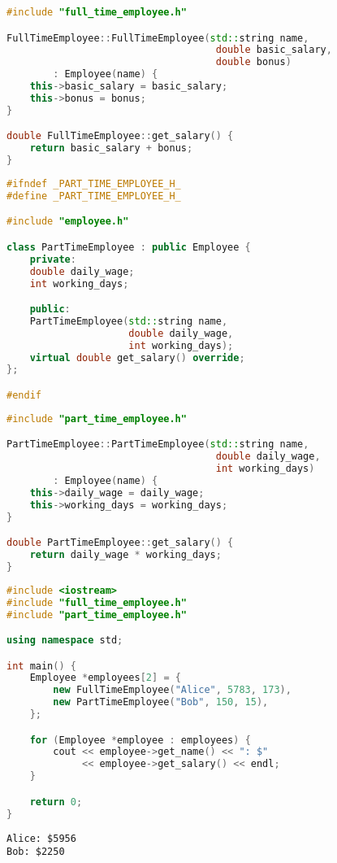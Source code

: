 \begin{lstlisting}[language=C++]
#include "full_time_employee.h"

FullTimeEmployee::FullTimeEmployee(std::string name,
                                    double basic_salary,
                                    double bonus)
        : Employee(name) {
    this->basic_salary = basic_salary;
    this->bonus = bonus;
}

double FullTimeEmployee::get_salary() {
    return basic_salary + bonus;
}
\end{lstlisting}

\begin{lstlisting}[language=C++]
#ifndef _PART_TIME_EMPLOYEE_H_
#define _PART_TIME_EMPLOYEE_H_

#include "employee.h"

class PartTimeEmployee : public Employee {
    private:
    double daily_wage;
    int working_days;

    public:
    PartTimeEmployee(std::string name,
                     double daily_wage,
                     int working_days);
    virtual double get_salary() override;
};

#endif
\end{lstlisting}

\begin{lstlisting}[language=C++]
#include "part_time_employee.h"

PartTimeEmployee::PartTimeEmployee(std::string name,
                                    double daily_wage,
                                    int working_days)
        : Employee(name) {
    this->daily_wage = daily_wage;
    this->working_days = working_days;
}

double PartTimeEmployee::get_salary() {
    return daily_wage * working_days;
}
\end{lstlisting}

\begin{lstlisting}[language=C++]
#include <iostream>
#include "full_time_employee.h"
#include "part_time_employee.h"

using namespace std;

int main() {
    Employee *employees[2] = {
        new FullTimeEmployee("Alice", 5783, 173),
        new PartTimeEmployee("Bob", 150, 15),
    };

    for (Employee *employee : employees) {
        cout << employee->get_name() << ": $"
             << employee->get_salary() << endl;
    }

    return 0;
}
\end{lstlisting}

\begin{tcolorbox}
    \begin{verbatim}
Alice: $5956
Bob: $2250
	\end{verbatim}
\end{tcolorbox}

\newpage